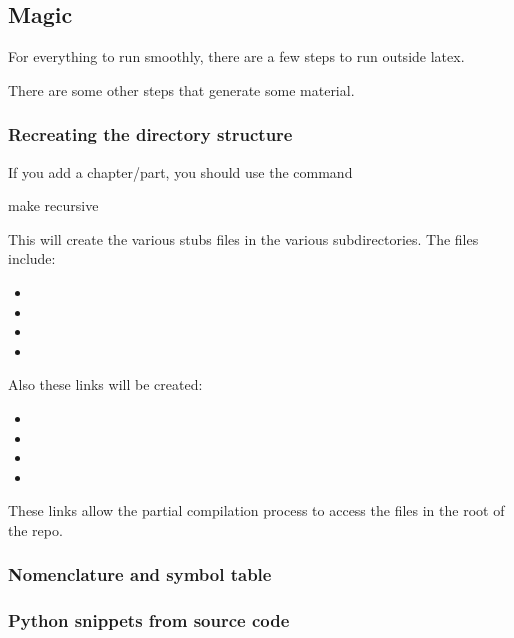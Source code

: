 \subsection{Magic}
For everything to run smoothly, there are a few steps to run outside latex.

There are some other steps that generate some material.

\subsubsection{Recreating the directory structure}

If you add a chapter/part, you should use the command

\begin{console}
    make recursive
\end{console}

This will create the various stubs files in the various subdirectories.
The files include:
\begin{itemize}
    \item {}
    \item {}
    \item {}
    \item {}
\end{itemize}
Also these links will be created:
\begin{itemize}
    \item {}
    \item {}
    \item {}
    \item {}
\end{itemize}
These links allow the partial compilation process to access the files in the root of the repo.

\subsubsection{Nomenclature and symbol table}


\subsubsection{Python snippets from source code}



